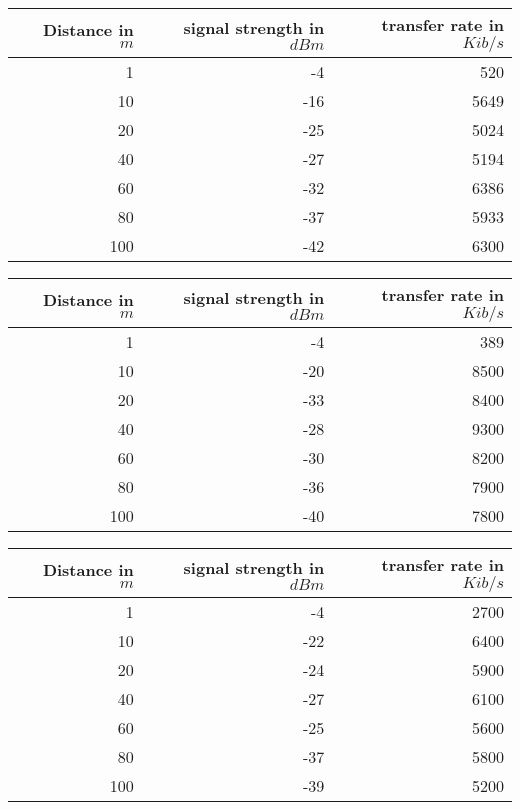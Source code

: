 \begin{table}
	\begin{center}
		\begin{tabular}{r|r|r}\
		 Distance in $m$ & signal strength in $dBm$ & transfer rate in $Kib/s$\\
		 \hline 
		 1 & -4 & 520\\
		 10 & -16 & 5649\\
		 20 & -25 & 5024\\
		 40 & -27 & 5194\\
		 60 & -32 & 6386\\
		 80 & -37 & 5933\\
		 100 & -42 & 6300\\
		\end{tabular}
	\end{center}
\end{table}

\begin{table}
	\begin{center}
		\begin{tabular}{r|r|r}\
			Distance in $m$ & signal strength in $dBm$ & transfer rate in $Kib/s$\\
			\hline 
			1 & -4 & 389\\
			10 & -20 & 8500\\
			20 & -33 & 8400\\
			40 & -28 & 9300\\
			60 & -30 & 8200\\
			80 & -36 & 7900\\
			100 & -40 & 7800\\
		\end{tabular}
	\end{center}
\end{table}

\begin{table}
	\begin{center}
		\begin{tabular}{r|r|r}\
			Distance in $m$ & signal strength in $dBm$ & transfer rate in $Kib/s$\\
			\hline 
			1 & -4 & 2700\\
			10 & -22 & 6400\\
			20 & -24 & 5900\\
			40 & -27 & 6100\\
			60 & -25 & 5600\\
			80 & -37 & 5800\\
			100 & -39 & 5200\\
		\end{tabular}
	\end{center}
\end{table}

